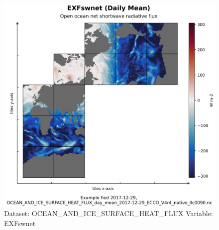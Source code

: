 \begin{figure}[H]
\centering
\includegraphics[scale=0.55]{../images/plots/native_plots/Ocean_and_Sea-Ice_Surface_Heat_Fluxes/EXFswnet.png}
\caption{Dataset: OCEAN\_AND\_ICE\_SURFACE\_HEAT\_FLUX Variable: EXFswnet}
\label{tab:table-OCEAN_AND_ICE_SURFACE_HEAT_FLUX_EXFswnet-Plot}
\end{figure}
\pagebreak
